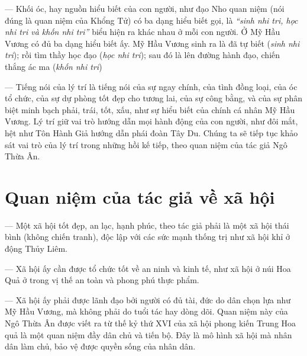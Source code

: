 --- Khối óc, hay nguồn hiểu biết của con người, như đạo Nho quan niệm (nói đúng là quan niệm của Khổng Tử) có ba dạng hiểu biết gọi, là \emph{``sinh nhi tri, học nhi tri và khốn nhi tri''} biểu hiện ra khác nhau ở mỗi con người. Ở Mỹ Hầu Vương có đủ ba dạng hiểu biết ấy. Mỹ Hầu Vương sinh ra là đã tự biết (\emph{sinh nhi tri}); rồi tìm thầy học đạo (\emph{học nhi tri}); sau đó là lên đường hành đạo, chiến thắng ác ma (\emph{khốn nhi tri})

--- Tiếng nói của lý trí là tiếng nói của sự ngay chính, của tình đồng loại, của óc tổ chức, của sự dự phòng tốt đẹp cho tương lai, của sự công bằng, và của sự phân biệt minh bạch phải, trái, tốt, xấu, như sự hiểu biết của chính cá nhân Mỹ Hầu Vương. Lý trí giữ vai trò hướng dẫn mọi hành động của con người, như đôi mắt, hệt như Tôn Hành Giả hướng dẫn phái đoàn Tây Du. Chúng ta sẽ tiếp tục khảo sát vai trò của lý trí trong những hồi kế tiếp, theo quan niệm của tác giả Ngô Thừa Ân.


\section{Quan niệm của tác giả về xã hội} %
\label{sec:1_quan_ve_xa_hoi}

--- Một xã hội tốt đẹp, an lạc, hạnh phúc, theo tác giả phải là một xã hội thái bình (không chiến tranh), độc lập với các sức mạnh thống trị như xã hội khỉ ở động Thủy Liêm.

--- Xã hội ấy cần được tổ chức tốt về an ninh và kinh tế, như xã hội ở núi Hoa Quả ở trong vị thế an toàn và phong phú thực phẩm.

--- Xã hội ấy phải được lãnh đạo bởi người có đủ tài, đức do dân chọn lựa như Mỹ Hầu Vương, mà không phải do tuổi tác hay dòng dõi. Quan niệm này của Ngô Thừa Ân được viết ra từ thế kỷ thứ XVI của xã hội phong kiến Trung Hoa quả là một quan niệm đầy dân chủ và tiến bộ. Đây là mô hình xã hội mà nhân dân làm chủ, bảo vệ được quyền sống của nhân dân.
